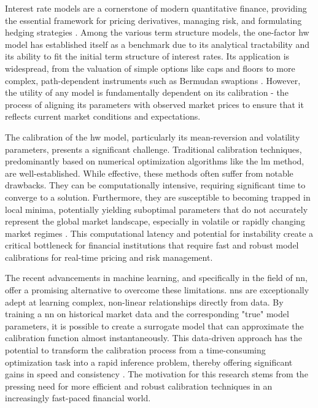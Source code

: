 Interest rate models are a cornerstone of modern quantitative finance, providing the essential framework for pricing derivatives, managing risk, and formulating hedging strategies \parencite{moysiadis2019calibrating}. Among the various term structure models, the one-factor \ac{hw} model has established itself as a benchmark due to its analytical tractability and its ability to fit the initial term structure of interest rates. Its application is widespread, from the valuation of simple options like caps and floors to more complex, path-dependent instruments such as Bermudan swaptions \parencite[p.~72]{brigo2006interest}. However, the utility of any model is fundamentally dependent on its calibration - the process of aligning its parameters with observed market prices to ensure that it reflects current market conditions and expectations.

The calibration of the \ac{hw} model, particularly its mean-reversion and volatility parameters, presents a significant challenge. Traditional calibration techniques, predominantly based on numerical optimization algorithms like the \ac{lm} method, are well-established. While effective, these methods often suffer from notable drawbacks. They can be computationally intensive, requiring significant time to converge to a solution. Furthermore, they are susceptible to becoming trapped in local minima, potentially yielding suboptimal parameters that do not accurately represent the global market landscape, especially in volatile or rapidly changing market regimes \parencite{vollrath2009calibration}. This computational latency and potential for instability create a critical bottleneck for financial institutions that require fast and robust model calibrations for real-time pricing and risk management.

The recent advancements in machine learning, and specifically in the field of \ac{nn}, offer a promising alternative to overcome these limitations. \ac{nn}s are exceptionally adept at learning complex, non-linear relationships directly from data. By training a \ac{nn} on historical market data and the corresponding "true" model parameters, it is possible to create a surrogate model that can approximate the calibration function almost instantaneously. This data-driven approach has the potential to transform the calibration process from a time-consuming optimization task into a rapid inference problem, thereby offering significant gains in speed and consistency \parencite{hernandez2016model}. The motivation for this research stems from the pressing need for more efficient and robust calibration techniques in an increasingly fast-paced financial world.

